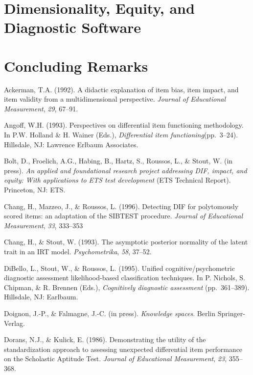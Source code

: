 \documentclass[titlepage,11pt,twoside]{article}
\begin{document}
\section{Dimensionality, Equity, and Diagnostic Software}


\section{Concluding Remarks}

\vspace{\fill}\clearpage

\begin{thebibliography}

\bibitem Ackerman, T.A. (1992). A didactic explanation of item bias, item impact, and item validity from a multidimensional perspective. \textit{Journal of Educational Measurement}, \textit{29}, 67--91.

\bibitem Angoff, W.H. (1993). Perspectives on differential item functioning methodology. In P.W. Holland \& H. Wainer (Eds.), \textit{Differential item functioning}(pp.~3--24). Hillsdale, NJ: Lawrence Erlbaum Associates.

\bibitem Bolt, D., Froelich, A.G., Habing, B., Hartz, S., Roussos, L., \& Stout, W. (in press). \textit{An applied and foundational research project addressing DIF, impact, and equity: With applications to ETS test development} (ETS Technical Report). Princeton, NJ: ETS.

Chang, H., Mazzeo, J., \& Roussos, L. (1996). Detecting DIF for polytomously scored items: an adaptation of the SIBTEST procedure. \textit{Journal of Educational Measurement}, \textit{33}, 333--353

\bibitem Chang, H., \& Stout, W. (1993). The asymptotic posterior normality of the latent trait in an IRT model. \textit{Psychometrika}, \textit{58}, 37--52.


\bibitem DiBello, L., Stout, W., \& Roussos, L. (1995). Unified cognitive/psychometric diagnostic assessment likelihood-based classification techniques. In P. Nichols, S. Chipman, \& R. Brennen (Eds.), \textit{Cognitively diagnostic assessment} (pp.~361--389). Hillsdale, NJ: Earlbaum.

\bibitem Doignon, J.-P., \& Falmagne, J.-C. (in press). \textit{Knowledge spaces}. Berlin Springer-Verlag.

\bibitem Dorans, N.J., \& Kulick, E. (1986). Demonstrating the utility of the standardization approach to assessing unexpected differential item performance on the Scholastic Aptitude Test. \textit{Journal of Educational Measurement}, \textit{23}, 355--368.


\end{thebibliography}
\end{document}
